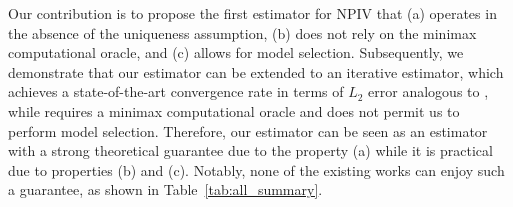
Our contribution is to propose the first estimator for NPIV that (a) operates in the absence of the uniqueness assumption, (b) does not rely on the minimax computational oracle, and (c) allows for model selection. Subsequently, we demonstrate that our estimator can be extended to an iterative estimator, which achieves a state-of-the-art convergence rate in terms of $L_2$ error analogous to  \citet{bennett2023source}, while \citet{bennett2023source} requires a minimax computational oracle and does not permit us to perform model selection. Therefore, our estimator can be seen as an estimator with a strong theoretical guarantee due to the property (a) while it is practical due to properties (b) and (c). Notably, none of the existing works can enjoy such a guarantee, as shown in Table~\ref{tab:all_summary}. 














